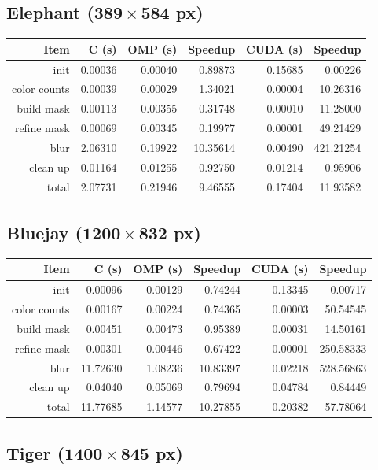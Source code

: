 \documentclass[12pt]{article}
\begin{document}
\subsection{Elephant ($\mathbf{389 \times 584}$ px)}

\begin{tabular}{r|r|r|r|r|r}
    Item & C (s) & OMP (s) & Speedup & CUDA (s) & Speedup
\\  \hline
    init & 0.00036 & 0.00040 & 0.89873 & 0.15685 & 0.00226
\\  color counts & 0.00039 & 0.00029 & 1.34021 & 0.00004 & 10.26316
\\  build mask & 0.00113 & 0.00355 & 0.31748 & 0.00010 & 11.28000
\\  refine mask & 0.00069 & 0.00345 & 0.19977 & 0.00001 & 49.21429
\\  blur & 2.06310 & 0.19922 & 10.35614 & 0.00490 & 421.21254
\\  clean up & 0.01164 & 0.01255 & 0.92750 & 0.01214 & 0.95906
\\  \hline
    total & 2.07731 & 0.21946 & 9.46555 & 0.17404 & 11.93582
\end{tabular}

\subsection{Bluejay ($\mathbf{1200 \times 832}$ px)}

\begin{tabular}{r|r|r|r|r|r}
    Item & C (s) & OMP (s) & Speedup & CUDA (s) & Speedup
\\  \hline
    init & 0.00096 & 0.00129 & 0.74244 & 0.13345 & 0.00717
\\  color counts & 0.00167 & 0.00224 & 0.74365 & 0.00003 & 50.54545
\\  build mask & 0.00451 & 0.00473 & 0.95389 & 0.00031 & 14.50161
\\  refine mask & 0.00301 & 0.00446 & 0.67422 & 0.00001 & 250.58333
\\  blur & 11.72630 & 1.08236 & 10.83397 & 0.02218 & 528.56863
\\  clean up & 0.04040 & 0.05069 & 0.79694 & 0.04784 & 0.84449
\\  \hline
    total & 11.77685 & 1.14577 & 10.27855 & 0.20382 & 57.78064
\end{tabular}

\subsection{Tiger ($\mathbf{1400 \times 845}$ px)}
\end{document}
